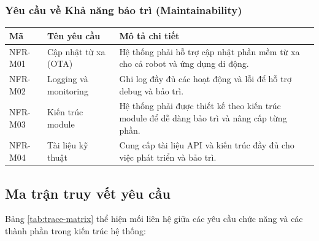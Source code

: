 \newpage
\subsubsection{Yêu cầu về Khả năng bảo trì (Maintainability)}

\begin{table}[h!]
\centering
\label{tab:nfr-maint}
\begin{tabular}{|L{1.5cm}|L{3.5cm}|L{8.5cm}|}
\hline
\textbf{Mã} & \textbf{Tên yêu cầu} & \textbf{Mô tả chi tiết} \\
\hline
NFR-M01 & Cập nhật từ xa (OTA) & Hệ thống phải hỗ trợ cập nhật phần mềm từ xa cho cả robot và ứng dụng di động. \\
\hline
NFR-M02 & Logging và monitoring & Ghi log đầy đủ các hoạt động và lỗi để hỗ trợ debug và bảo trì. \\
\hline
NFR-M03 & Kiến trúc module & Hệ thống phải được thiết kế theo kiến trúc module để dễ dàng bảo trì và nâng cấp từng phần. \\
\hline
NFR-M04 & Tài liệu kỹ thuật & Cung cấp tài liệu API và kiến trúc đầy đủ cho việc phát triển và bảo trì. \\
\hline
\end{tabular}
\end{table}

\subsection{Ma trận truy vết yêu cầu}

Bảng \ref{tab:trace-matrix} thể hiện mối liên hệ giữa các yêu cầu chức năng và các thành phần trong kiến trúc hệ thống:

\begin{table}[h!]
\centering
\caption{Ma trận truy vết yêu cầu - Thành phần hệ thống}
\label{tab:trace-matrix}
\end{table}

